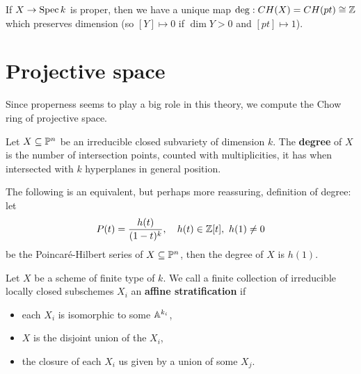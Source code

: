 \begin{proposition}
If $X\to \operatorname{Spec} k$ is proper, then we have a unique map $\deg:CH(X)=CH(pt)\cong \mathbb{Z}$ which preserves dimension (so $[Y]\mapsto 0$ if $\dim Y>0$ and $[pt]\mapsto 1$).
\end{proposition}



\section{Projective space}
Since properness seems to play a big role in this theory, we compute the Chow ring of projective space.

\begin{definition}[]
Let $X\subseteq \mathbb{P}^n$ be an irreducible closed subvariety of dimension $k$. The \textbf{degree} of $X$ is the number of intersection points, counted with multiplicities, it has when intersected with $k$ hyperplanes in general position.
\end{definition}

\begin{remark}
The following is an equivalent, but perhaps more reassuring, definition of degree: let 
\[P(t)=\frac{h(t)}{(1-t)^k},\quad h(t)\in \Z[t],\ h(1)\neq 0\]
be the Poincar\'e-Hilbert series of $X\subseteq \mathbb{P}^n$, then the degree of $X$ is $h(1)$.
\end{remark}

\begin{definition}[]
Let $X$ be a scheme of finite type of $k$. We call a finite collection of irreducible locally closed subschemes $X_i$ an \textbf{affine stratification} if 
\begin{itemize}
\item each $X_i$ is isomorphic to some $\mathbb{A}^{k_i}$,
\item $X$ is the disjoint union of the $X_i$,
\item the closure of each $X_i$ us given by a union of some $X_j$.
\end{itemize}
\end{definition}

